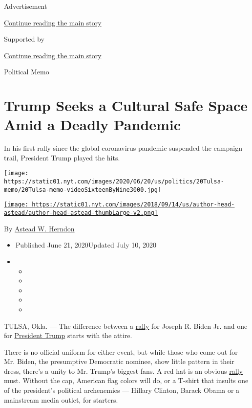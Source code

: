 Advertisement

\protect\hyperlink{after-top}{Continue reading the main story}

Supported by

\protect\hyperlink{after-sponsor}{Continue reading the main story}

Political Memo

\hypertarget{trump-seeks-a-cultural-safe-space-amid-a-deadly-pandemic}{%
\section{Trump Seeks a Cultural Safe Space Amid a Deadly
Pandemic}\label{trump-seeks-a-cultural-safe-space-amid-a-deadly-pandemic}}

In his first rally since the global coronavirus pandemic suspended the
campaign trail, President Trump played the hits.

\texttt{[image: https://static01.nyt.com/images/2020/06/20/us/politics/20Tulsa-memo/20Tulsa-memo-videoSixteenByNine3000.jpg]}

\href{https://www.nytimes.com/by/astead-w-herndon}{\texttt{[image: https://static01.nyt.com/images/2018/09/14/us/author-head-astead/author-head-astead-thumbLarge-v2.png]}}

By \href{https://www.nytimes.com/by/astead-w-herndon}{Astead W. Herndon}

\begin{itemize}
\item
  Published June 21, 2020Updated July 10, 2020
\item
  \begin{itemize}
  \item
  \item
  \item
  \item
  \item
  \end{itemize}
\end{itemize}

TULSA, Okla. --- The difference between a
\href{https://www.nytimes.com/2020/07/10/us/politics/trump-nh-rally-postponed.html}{rally}
for Joseph R. Biden Jr. and one for
\href{https://www.nytimes.com/2020/06/22/style/trump-tulsa-tie.html}{President
Trump} starts with the attire.

There is no official uniform for either event, but while those who come
out for Mr. Biden, the presumptive Democratic nominee, show little
pattern in their dress, there's a unity to Mr. Trump's biggest fans. A
red hat is an obvious
\href{https://www.nytimes.com/2020/06/22/us/politics/trump-rally-coronavirus.html}{rally}
must. Without the cap, American flag colors will do, or a T-shirt that
insults one of the president's political archenemies --- Hillary
Clinton, Barack Obama or a mainstream media outlet, for starters.

